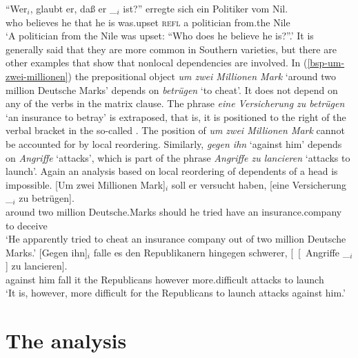 \ex 
\gll "`Wer$_i$, glaubt er, daß er \_$_i$ ist?"' erregte sich ein Politiker vom Nil.\footnotemark\\
     \hphantom{"`}who believes he that he {} is was.upset \textsc{refl} a politician from.the Nile\\
\glt `A politician from the Nile was upset: ``Who does he believe he is?''.'
\zl
It is generally said that they are more common in Southern  varieties, but there are other
examples that show that nonlocal dependencies are involved. In (\ref{bsp-um-zwei-millionen}) the
prepositional object \emph{um zwei Millionen Mark} `around two million Deutsche Marks' depends on
\emph{betrügen} `to cheat'. It does not
depend on any of the verbs in the matrix clause. The phrase \emph{eine Versicherung zu betrügen} `an
insurance to betray' is extraposed, that is, it is positioned to the right of the verbal bracket in the so-called \nf. The
position of \emph{um zwei Millionen Mark} cannot be accounted for by local reordering. Similarly,
\emph{gegen ihn} `against him' depends on \emph{Angriffe} `attacks', which is part of the phrase \emph{Angriffe zu
  lancieren} `attacks to launch'. Again an analysis based on local reordering of dependents of a head is impossible.
\eal
\label{bsp-Fernabhaengigkeit}
\ex\label{bsp-um-zwei-millionen}
\gll {}[Um zwei Millionen Mark]$_i$ soll er versucht haben, [eine Versicherung \_$_i$ zu betrügen].\footnotemark\\
       \spacebr{}around two million Deutsche.Marks should he tried have \spacebr{}an insurance.company {} to deceive\\\german
{}
\glt `He apparently tried to cheat an insurance company out of two million Deutsche Marks.'
\ex
\gll {}[Gegen ihn]$_i$ falle es den Republikanern hingegen schwerer, [~[~Angriffe \_$_i$] zu lancieren].\footnotemark\\
	 {}\spacebr{}against him fall it the Republicans however more.difficult \hphantom{[~[~}attacks {} to launch\\
\glt `It is, however, more difficult for the Republicans to launch attacks against him.'
\zl
{}


\section{The analysis}
\label{sec-analysis-verb-mevement}

